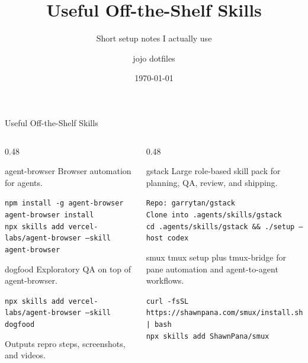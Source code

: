 \documentclass[aspectratio=169]{beamer}
\title{Useful Off-the-Shelf Skills}
\subtitle{Short setup notes I actually use}
\author{jojo dotfiles}
\date{\today}
\begin{document}
\begin{frame}{Useful Off-the-Shelf Skills}
\small
\begin{columns}[T,onlytextwidth]
\begin{column}{0.48\textwidth}
\begin{block}{agent-browser}
Browser automation for agents.

\vspace{0.35em}
\scriptsize
\texttt{npm install -g agent-browser}\\
\texttt{agent-browser install}\\
\texttt{npx skills add vercel-labs/agent-browser --skill agent-browser}
\end{block}
\begin{block}{dogfood}
Exploratory QA on top of agent-browser.

\vspace{0.35em}
\scriptsize
\texttt{npx skills add vercel-labs/agent-browser --skill dogfood}

\vspace{0.5em}
Outputs repro steps, screenshots, and videos.
\end{block}
\end{column}

\begin{column}{0.48\textwidth}
\begin{block}{gstack}
Large role-based skill pack for planning, QA, review, and shipping.

\vspace{0.35em}
\scriptsize
\texttt{Repo: garrytan/gstack}\\
\texttt{Clone into .agents/skills/gstack}\\
\texttt{cd .agents/skills/gstack \&\& ./setup --host codex}
\end{block}
\begin{block}{smux}
tmux setup plus tmux-bridge for pane automation and agent-to-agent workflows.

\vspace{0.35em}
\scriptsize
\texttt{curl -fsSL https://shawnpana.com/smux/install.sh | bash}\\
\texttt{npx skills add ShawnPana/smux}
\end{block}
\end{column}
\end{columns}
\end{frame}
\end{document}
